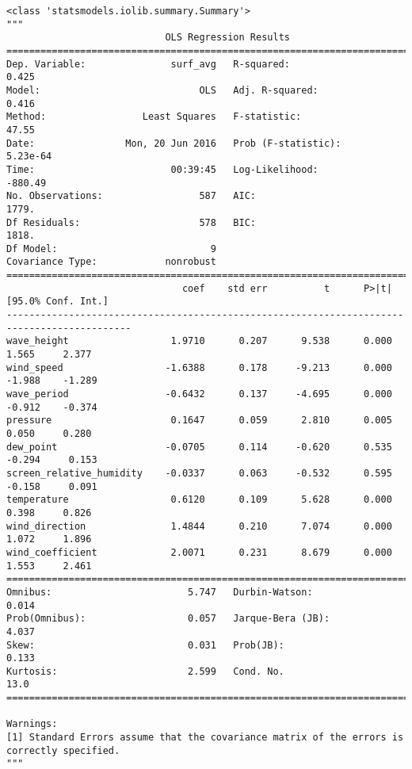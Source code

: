 \documentclass[11pt]{article}
\begin{document}
    
    \begin{verbatim}
<class 'statsmodels.iolib.summary.Summary'>
"""
                            OLS Regression Results                            
==============================================================================
Dep. Variable:               surf_avg   R-squared:                       0.425
Model:                            OLS   Adj. R-squared:                  0.416
Method:                 Least Squares   F-statistic:                     47.55
Date:                Mon, 20 Jun 2016   Prob (F-statistic):           5.23e-64
Time:                        00:39:45   Log-Likelihood:                -880.49
No. Observations:                 587   AIC:                             1779.
Df Residuals:                     578   BIC:                             1818.
Df Model:                           9                                         
Covariance Type:            nonrobust                                         
============================================================================================
                               coef    std err          t      P>|t|      [95.0% Conf. Int.]
--------------------------------------------------------------------------------------------
wave_height                  1.9710      0.207      9.538      0.000         1.565     2.377
wind_speed                  -1.6388      0.178     -9.213      0.000        -1.988    -1.289
wave_period                 -0.6432      0.137     -4.695      0.000        -0.912    -0.374
pressure                     0.1647      0.059      2.810      0.005         0.050     0.280
dew_point                   -0.0705      0.114     -0.620      0.535        -0.294     0.153
screen_relative_humidity    -0.0337      0.063     -0.532      0.595        -0.158     0.091
temperature                  0.6120      0.109      5.628      0.000         0.398     0.826
wind_direction               1.4844      0.210      7.074      0.000         1.072     1.896
wind_coefficient             2.0071      0.231      8.679      0.000         1.553     2.461
==============================================================================
Omnibus:                        5.747   Durbin-Watson:                   0.014
Prob(Omnibus):                  0.057   Jarque-Bera (JB):                4.037
Skew:                           0.031   Prob(JB):                        0.133
Kurtosis:                       2.599   Cond. No.                         13.0
==============================================================================

Warnings:
[1] Standard Errors assume that the covariance matrix of the errors is correctly specified.
"""
    \end{verbatim}
\end{document}
